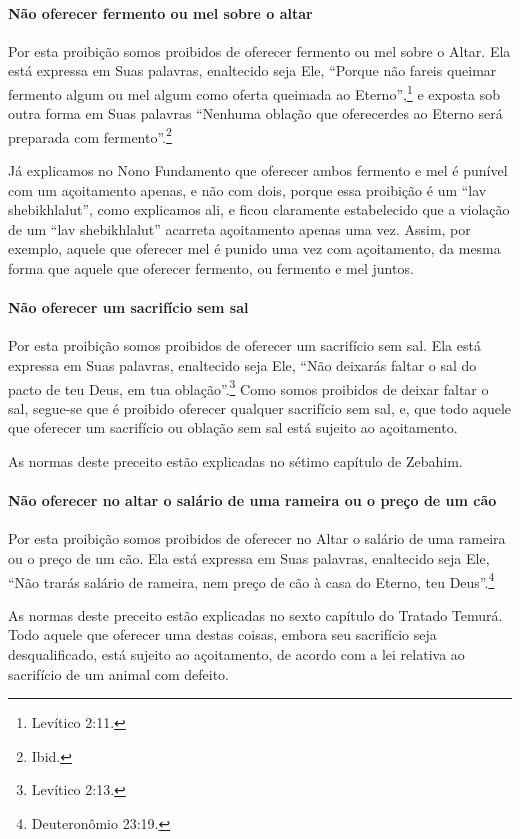 \paragraph{Não oferecer fermento ou mel sobre o altar}

Por esta proibição somos proibidos de oferecer fermento ou mel sobre o
Altar. Ela está expressa em Suas palavras, enaltecido seja Ele, ``Porque
não fareis queimar fermento algum ou mel algum como oferta queimada ao
Eterno'',\footnote{Levítico 2:11.} e exposta sob outra forma em Suas palavras
``Nenhuma oblação que oferecerdes ao Eterno será preparada com
fermento''.\footnote{Ibid.}

Já explicamos no Nono Fundamento que oferecer ambos fermento e mel é
punível com um açoitamento apenas, e não com dois, porque essa
proibição é um ``lav shebikhlalut'', como explicamos ali, e ficou
claramente estabelecido que a violação de um ``lav shebikhlalut''
acarreta açoitamento apenas uma vez. Assim, por exemplo, aquele que
oferecer mel é punido uma vez com açoitamento, da mesma forma que aquele
que oferecer fermento, ou fermento e mel juntos.

\paragraph{Não oferecer um sacrifício sem sal}

Por esta proibição somos proibidos de oferecer um sacrifício sem sal.
Ela está expressa em Suas palavras, enaltecido seja Ele, ``Não deixarás
faltar o sal do pacto de teu Deus, em tua oblação''.\footnote{Levítico 2:13.}
Como somos proibidos de deixar faltar o sal, segue-se que é proibido
oferecer qualquer sacrifício sem sal, e, que todo aquele que oferecer um
sacrifício ou oblação sem sal está sujeito ao açoitamento.

As normas deste preceito estão explicadas no sétimo capítulo de Zebahim.

\paragraph{Não oferecer no altar o salário de uma rameira ou o preço de um cão}

Por esta proibição somos proibidos de oferecer no Altar o salário de uma
rameira ou o preço de um cão. Ela está expressa em Suas palavras,
enaltecido seja Ele, ``Não trarás salário de rameira, nem preço de cão
à casa do Eterno, teu Deus''.\footnote{Deuteronômio 23:19.}

As normas deste preceito estão explicadas no sexto capítulo do Tratado
Temurá. Todo aquele que oferecer uma destas coisas, embora seu
sacrifício seja desqualificado, está sujeito ao açoitamento, de acordo
com a lei relativa ao sacrifício de um animal com defeito.


